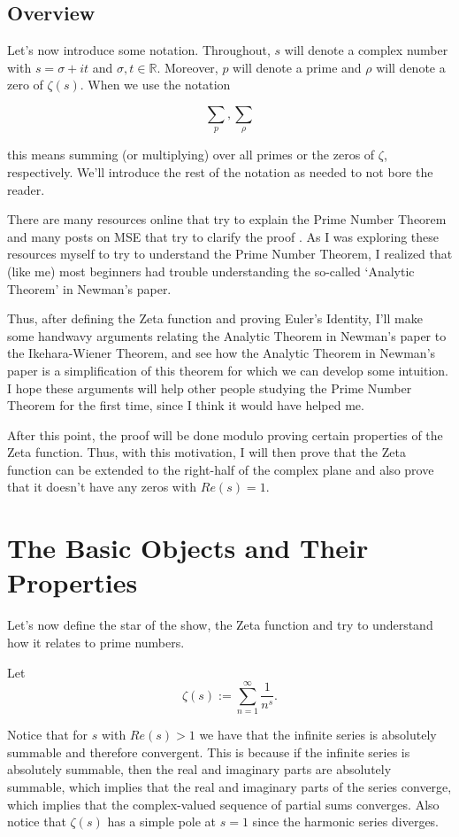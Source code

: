 \documentclass{article}
\theoremstyle{definition}
\begin{document}
\subsection{Overview}

Let's now introduce some notation. Throughout, $ s $ will denote a complex number with $ s = \sigma + it $ and $ \sigma, t \in \mathbb{R} $.
Moreover, $ p $ will denote a prime and $ \rho $ will denote a zero of $ \zeta(s) $.
When we use the notation 

\[ \sum_{p}, \sum_{\rho}\]

this means summing (or multiplying) over all primes or the zeros of $ \zeta $, respectively. We'll introduce
the rest of the notation as needed to not bore the reader.

There are many resources online that try to explain the Prime Number Theorem and many posts
on MSE that try to clarify the proof \cite{bandeira_complex_nodate} \cite{avi_why_2015} \cite{coffee_table_what_2018}. 
As I was exploring these resources myself to try to
understand the Prime Number Theorem, I realized that (like me) most beginners
had trouble understanding the so-called `Analytic Theorem' in Newman's paper.

Thus, after defining the Zeta function and proving Euler's Identity, I'll
make some handwavy arguments relating the Analytic Theorem in Newman's paper
to the Ikehara-Wiener Theorem, and see how the Analytic Theorem in Newman's paper
is a simplification of this theorem for which we can develop some intuition. I hope these
arguments will help other people studying the Prime Number Theorem for the first time,
since I think it would have helped me.

After this point, the proof will be done modulo proving certain properties of the Zeta function.
Thus, with this motivation, I will then prove that the Zeta function can be extended to the
right-half of the complex plane and also prove that it doesn't have any zeros with $ Re(s) = 1 $.

\section{The Basic Objects and Their Properties}

Let's now define the star of the show, the Zeta function and
try to understand how it relates to prime numbers.

Let \[ \zeta(s) := \sum_{n = 1}^{\infty} \frac{1}{n^{s}} .\] 

Notice that for $ s $ with $ Re(s) > 1 $ we have that the infinite series is absolutely
summable and therefore convergent. This is because if the infinite series is absolutely
summable, then the real and imaginary parts are absolutely summable, which implies that
the real and imaginary parts of the series converge, which implies that the complex-valued
sequence of partial sums converges. Also notice that $ \zeta(s) $ has a simple pole
at $ s = 1 $ since the harmonic series diverges. 
\end{document}
